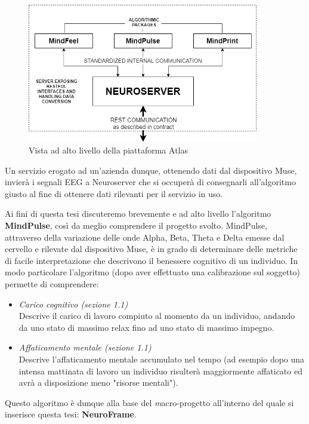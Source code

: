 \begin{figure}[H]
  \centering
  \includegraphics[width=0.90\textwidth]{img/atlas.png}
  \caption{Vista ad alto livello della piattaforma Atlas}
\end{figure}
Un servizio erogato ad un'azienda dunque, ottenendo dati dal dispositivo Muse, invierà i segnali EEG a Neuroserver che si occuperà di consegnarli all'algoritmo giusto al fine di ottenere dati rilevanti per il servizio in uso.\newline

\noindent Ai fini di questa tesi discuteremo brevemente e ad alto livello l'algoritmo {\bf MindPulse}, così da meglio comprendere il progetto svolto.\newline
MindPulse, attraverso della variazione delle onde Alpha, Beta, Theta e Delta emesse dal cervello e rilevate dal dispositivo Muse, è in grado di determinare delle metriche di facile interpretazione che descrivono il benessere cognitivo di un individuo.\newline
In modo particolare l'algoritmo (dopo aver effettuato una calibrazione sul soggetto) permette di comprendere:
\begin{itemize}
  \item \emph{Carico cognitivo (sezione 1.1)}\\
  Descrive il carico di lavoro compiuto al momento da un individuo, andando da uno stato di massimo relax fino ad uno stato di massimo impegno.
  \item \emph{Affaticamento mentale (sezione 1.1)}\\
  Descrive l'affaticamento mentale accumulato nel tempo (ad esempio dopo una intensa mattinata di lavoro un individuo risulterà maggiormente affaticato ed avrà a disposizione meno "risorse mentali").
\end{itemize}
Questo algoritmo è dunque alla base del {\emph macro-progetto} all'interno del quale si inserisce questa tesi: {\bf NeuroFrame}.
